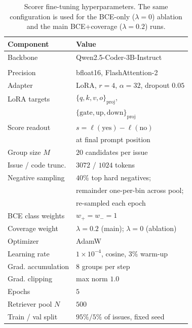 \begin{table}[h]
\centering
\small
\caption{Scorer fine-tuning hyperparameters. The same
configuration is used for the BCE-only ($\lambda{=}0$) ablation
and the main BCE+coverage ($\lambda{=}0.2$) runs.}
\label{tab:hparams}
\setlength{\tabcolsep}{4pt}
\renewcommand{\arraystretch}{1.05}
\begin{tabular}{ll}
\toprule
\textbf{Component} & \textbf{Value} \\
\midrule
Backbone               & Qwen2.5-Coder-3B-Instruct \\
                       & \citep{hui2024qwen25codertechnicalreport} \\
Precision              & bfloat16, FlashAttention-2 \\
Adapter                & LoRA, $r{=}4$, $\alpha{=}32$, dropout $0.05$ \\
LoRA targets           & $\{q,k,v,o\}_{\text{proj}}$, \\
                       & $\{\text{gate},\text{up},\text{down}\}_{\text{proj}}$ \\
Score readout          & $s = \ell(\text{yes}) - \ell(\text{no})$ \\
                       & at final prompt position \\
Group size $M$         & $20$ candidates per issue \\
Issue / code trunc.    & $3072$ / $1024$ tokens \\
Negative sampling      & $40\%$ top hard negatives; \\
                       & remainder one-per-bin across pool; \\
                       & re-sampled each epoch \\
BCE class weights      & $w_{+}{=}w_{-}{=}1$ \\
Coverage weight        & $\lambda{=}0.2$ (main); $\lambda{=}0$ (ablation) \\
Optimizer              & AdamW \\
Learning rate          & $1{\times}10^{-4}$, cosine, $3\%$ warm-up \\
Grad. accumulation     & $8$ groups per step \\
Grad. clipping         & max norm $1.0$ \\
Epochs                 & $5$ \\
Retriever pool $N$     & $500$ \\
Train / val split      & $95\%/5\%$ of issues, fixed seed \\
\bottomrule
\end{tabular}
\end{table}

